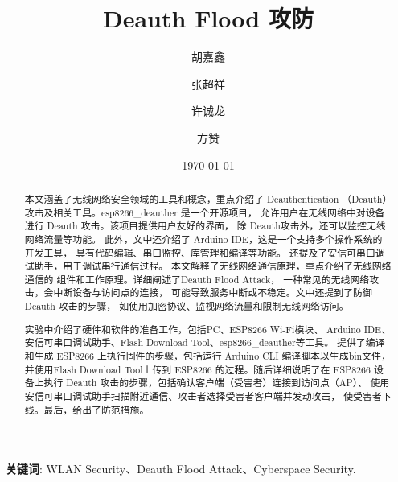\documentclass[UTF8, 12pt]{ctexart}
\title{Deauth Flood 攻防}
\author{胡嘉鑫 \and 张超祥 \and 许诚龙 \and 方赞}
\date{\today}
\begin{document}
%
\maketitle
\begin{abstract}
  本文涵盖了无线网络安全领域的工具和概念，重点介绍了 Deauthentication
  （Deauth）攻击及相关工具。esp8266\_deauther 是一个开源项目，
  允许用户在无线网络中对设备进行 Deauth 攻击。该项目提供用户友好的界面，
  除 Deauth攻击外，还可以监控无线网络流量等功能。
  此外，文中还介绍了 Arduino IDE，这是一个支持多个操作系统的开发工具，
  具有代码编辑、串口监控、库管理和编译等功能。
  还提及了安信可串口调试助手，用于调试串行通信过程。
  本文解释了无线网络通信原理，重点介绍了无线网络通信的
  组件和工作原理。详细阐述了Deauth Flood Attack，
  一种常见的无线网络攻击，会中断设备与访问点的连接，
  可能导致服务中断或不稳定。文中还提到了防御 Deauth 攻击的步骤，
  如使用加密协议、监视网络流量和限制无线网络访问。

  实验中介绍了硬件和软件的准备工作，包括PC、ESP8266 Wi-Fi模块、
  Arduino IDE、安信可串口调试助手、Flash Download Tool、esp8266\_deauther等工具。
  提供了编译和生成 ESP8266 上执行固件的步骤，包括运行 Arduino CLI 编译脚本以生成bin文件，
  并使用Flash Download Tool上传到 ESP8266 的过程。随后详细说明了在 ESP8266
  设备上执行 Deauth 攻击的步骤，包括确认客户端（受害者）连接到访问点（AP）、
  使用安信可串口调试助手扫描附近通信、攻击者选择受害者客户端并发动攻击，
  使受害者下线。最后，给出了防范措施。
\end{abstract}

\textbf{关键词}: WLAN Security、Deauth Flood Attack、Cyberspace Security.

\newpage
\tableofcontents
\newpage









\end{document}

